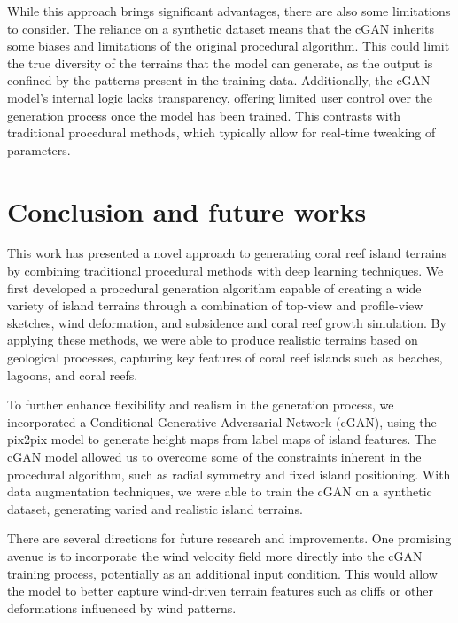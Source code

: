 While this approach brings significant advantages, there are also some limitations to consider. The reliance on a synthetic dataset means that the cGAN inherits some biases and limitations of the original procedural algorithm. This could limit the true diversity of the terrains that the model can generate, as the output is confined by the patterns present in the training data. Additionally, the cGAN model's internal logic lacks transparency, offering limited user control over the generation process once the model has been trained. This contrasts with traditional procedural methods, which typically allow for real-time tweaking of parameters.


\section{Conclusion and future works}
\label{sec:coral-island-conclusion}

This work has presented a novel approach to generating coral reef island terrains by combining traditional procedural methods with deep learning techniques. We first developed a procedural generation algorithm capable of creating a wide variety of island terrains through a combination of top-view and profile-view sketches, wind deformation, and subsidence and coral reef growth simulation. By applying these methods, we were able to produce realistic terrains based on geological processes, capturing key features of coral reef islands such as beaches, lagoons, and coral reefs.

To further enhance flexibility and realism in the generation process, we incorporated a Conditional Generative Adversarial Network (cGAN), using the pix2pix model to generate height maps from label maps of island features. The cGAN model allowed us to overcome some of the constraints inherent in the procedural algorithm, such as radial symmetry and fixed island positioning. With data augmentation techniques, we were able to train the cGAN on a synthetic dataset, generating varied and realistic island terrains.



There are several directions for future research and improvements. One promising avenue is to incorporate the wind velocity field more directly into the cGAN training process, potentially as an additional input condition. This would allow the model to better capture wind-driven terrain features such as cliffs or other deformations influenced by wind patterns.

